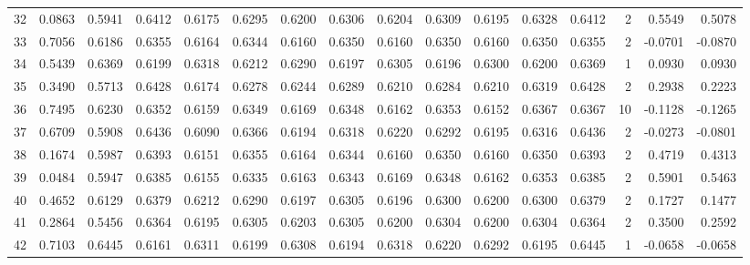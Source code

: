 \begin{tabular}{lrrrrrrrrrrrrrrr}
32  &      0.0863 &  0.5941 &  0.6412 &  0.6175 &  0.6295 &  0.6200 &  0.6306 &  0.6204 &  0.6309 &  0.6195 &   0.6328 &     0.6412 &      2 &                    0.5549 &                     0.5078 \\
33  &      0.7056 &  0.6186 &  0.6355 &  0.6164 &  0.6344 &  0.6160 &  0.6350 &  0.6160 &  0.6350 &  0.6160 &   0.6350 &     0.6355 &      2 &                   -0.0701 &                    -0.0870 \\
34  &      0.5439 &  0.6369 &  0.6199 &  0.6318 &  0.6212 &  0.6290 &  0.6197 &  0.6305 &  0.6196 &  0.6300 &   0.6200 &     0.6369 &      1 &                    0.0930 &                     0.0930 \\
35  &      0.3490 &  0.5713 &  0.6428 &  0.6174 &  0.6278 &  0.6244 &  0.6289 &  0.6210 &  0.6284 &  0.6210 &   0.6319 &     0.6428 &      2 &                    0.2938 &                     0.2223 \\
36  &      0.7495 &  0.6230 &  0.6352 &  0.6159 &  0.6349 &  0.6169 &  0.6348 &  0.6162 &  0.6353 &  0.6152 &   0.6367 &     0.6367 &     10 &                   -0.1128 &                    -0.1265 \\
37  &      0.6709 &  0.5908 &  0.6436 &  0.6090 &  0.6366 &  0.6194 &  0.6318 &  0.6220 &  0.6292 &  0.6195 &   0.6316 &     0.6436 &      2 &                   -0.0273 &                    -0.0801 \\
38  &      0.1674 &  0.5987 &  0.6393 &  0.6151 &  0.6355 &  0.6164 &  0.6344 &  0.6160 &  0.6350 &  0.6160 &   0.6350 &     0.6393 &      2 &                    0.4719 &                     0.4313 \\
39  &      0.0484 &  0.5947 &  0.6385 &  0.6155 &  0.6335 &  0.6163 &  0.6343 &  0.6169 &  0.6348 &  0.6162 &   0.6353 &     0.6385 &      2 &                    0.5901 &                     0.5463 \\
40  &      0.4652 &  0.6129 &  0.6379 &  0.6212 &  0.6290 &  0.6197 &  0.6305 &  0.6196 &  0.6300 &  0.6200 &   0.6300 &     0.6379 &      2 &                    0.1727 &                     0.1477 \\
41  &      0.2864 &  0.5456 &  0.6364 &  0.6195 &  0.6305 &  0.6203 &  0.6305 &  0.6200 &  0.6304 &  0.6200 &   0.6304 &     0.6364 &      2 &                    0.3500 &                     0.2592 \\
42  &      0.7103 &  0.6445 &  0.6161 &  0.6311 &  0.6199 &  0.6308 &  0.6194 &  0.6318 &  0.6220 &  0.6292 &   0.6195 &     0.6445 &      1 &                   -0.0658 &                    -0.0658 \\

\end{tabular}
